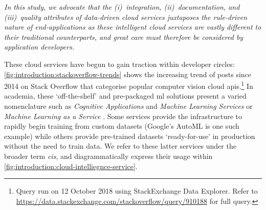 

\itshape
In this study, we advocate that the (i)~integration, (ii)~documentation, and (iii)~quality attributes of data-driven cloud services juxtaposes the rule-driven nature of end-applications as these intelligent cloud services are vastly different to their traditional counterparts, and great care must therefore be considered by application developers.
\upshape
\bigskip

These cloud services have begun to gain traction within developer circles: \cref{fig:introduction:stackoverflow-trends} shows the increasing trend of posts since 2014 on Stack Overflow that categorise popular computer vision cloud \glspl{api}.\footnote{Query run on 12 October 2018 using StackExchange Data Explorer. Refer to \url{https://data.stackexchange.com/stackoverflow/query/910188} for full query.} In academia, these `off-the-shelf' and pre-packaged \gls{ml} solutions present a varied nomenclature such as \textit{Cognitive Applications} and \textit{Machine Learning Services} \citep{Hwang:2017tr} or \textit{Machine Learning as a Service} \citep{Ribeiro:2015dz}. Some services provide the infrastructure to rapidly begin training from custom datasets (Google's AutoML is one such example) while others provide pre-trained datasets `ready-for-use' in production without the need to train data. We refer to these latter services under the broader term \textit{\gls{cis}}, and diagrammatically express their usage within \cref{fig:introduction:cloud-intelliegnce-service}.


